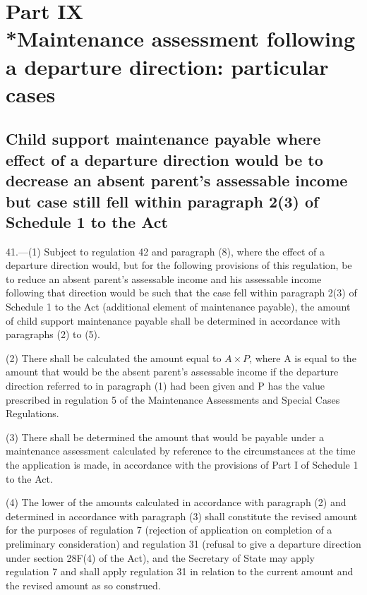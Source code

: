 \documentclass[a4paper]{article}
\newcommand{\parthead}{}
\begin{document}
\section[Part IX --- Maintenance assessment following a departure direction: particular cases]{Part IX\\*Maintenance assessment following a departure direction: particular cases}

\renewcommand\parthead{--- Part IX}

\subsection[41. Child support maintenance payable where effect of a departure direction
would be to decrease an absent parent’s assessable income but case still fell
within paragraph 2(3) of Schedule 1 to the Act]{Child support maintenance payable where effect of a departure direction
would be to decrease an absent parent’s assessable income but case still fell
within paragraph 2(3) of Schedule 1 to the Act}

41.—(1) Subject to regulation 42
and paragraph (8), where the effect of a departure direction would, but for the
following provisions of this regulation, be to reduce an absent parent’s
assessable income and his assessable income following that direction would be
such that the case fell within paragraph 2(3) of Schedule 1 to the Act
(additional element of maintenance payable), the amount of child support
maintenance payable shall be determined in accordance with paragraphs (2) to
(5).

(2) There shall be calculated the amount equal to \(A \times P\), where A is equal to the
amount that would be the absent parent’s assessable income if the departure
direction referred to in paragraph (1) had been given and P has the value
prescribed in regulation 5 of the Maintenance Assessments and Special Cases
Regulations.

(3) There shall be determined the amount that would be payable under a
maintenance assessment calculated by reference to the circumstances at the time
the application is made, in accordance with the provisions of Part I of Schedule
1 to the Act.

(4) The lower of the amounts calculated in accordance with paragraph (2) and
determined in accordance with paragraph (3) shall constitute the revised amount
for the purposes of regulation 7 (rejection of application on completion of a
preliminary consideration) and regulation 31 (refusal to give a departure
direction under section 28F(4) of the Act), and the Secretary of State may apply
regulation 7 and shall apply regulation 31 in relation to the current amount and
the revised amount as so construed.
\end{document}
